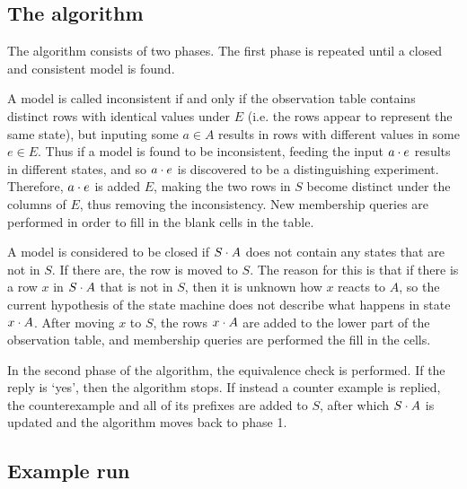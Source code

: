 \documentclass[multi,crop=false,class=article]{standalone}
\begin{document}
\subsection {The algorithm}

The algorithm consists of two phases. The first phase is repeated until a closed
and consistent model is found.

A model is called inconsistent if and only if the observation table contains
distinct rows with identical values under $E$ (i.e. the rows appear to represent
the same state), but inputing some $a \in A$ results in rows with different
values in some $e \in E$. Thus if a model is found to be inconsistent, feeding
the input $a \cdot e$ results in different states, and so $a \cdot e$ is
discovered to be a distinguishing experiment. Therefore, $a \cdot e$ is added
$E$, making the two rows in $S$ become distinct under the columns of $E$, thus
removing the inconsistency. New membership queries are performed in order to
fill in the blank cells in the table.

A model is considered to be closed if $S \cdot A$ does not contain any states
that are not in $S$. If there are, the row is moved to $S$. The reason for this
is that if there is a row $x$ in $S \cdot A$ that is not in $S$, then it is
unknown how $x$ reacts to $A$, so the current hypothesis of the state machine
does not describe what happens in state $x \cdot A$. After moving $x$ to $S$,
the rows $x \cdot A$ are added to the lower part of the observation table, and
membership queries are performed the fill in the cells. 

In the second phase of the algorithm, the equivalence check is performed. If the
reply is `yes', then the algorithm stops. If instead a counter example is
replied, the counterexample and all of its prefixes are added to $S$, after
which $S \cdot A$ is updated and the algorithm moves back to phase 1.

\subsection {Example run}
\end{document}
